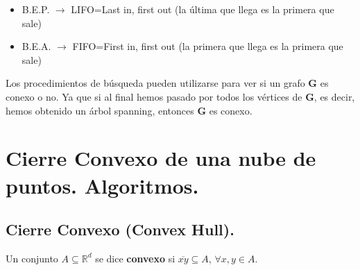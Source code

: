 \documentclass[twoside]{report}
\newcommand{\bs}[1]{\boldsymbol{#1}}
\begin{document}
        \begin{itemize}
            \item B.E.P. $\rightarrow$ LIFO=Last in, first out (la \'{u}ltima que llega es la primera que sale)
            \item B.E.A. $\rightarrow$ FIFO=First in, first out (la primera que llega es la primera que sale)
        \end{itemize}

\vspace{0.2cm}
Los procedimientos de b\'{u}squeda pueden u\-ti\-li\-zar\-se para ver si un grafo $\bs{G}$ es conexo o no. Ya que si al final hemos pasado por todos
los v\'{e}rtices de $\bs{G}$, es decir, hemos obtenido un \'{a}rbol spanning, entonces $\bs{G}$ es conexo.

%
%
%

\newpage

\section{Cierre Convexo de una nube de puntos. Algoritmos.}

\subsection{Cierre Convexo (Convex Hull).}

\begin{defi} Un conjunto $A \subseteq \mathbb{R}^d$ se dice
\textbf{convexo} si $\overline{xy} \subseteq A$, $\forall x,y \in A$.
\end{defi}
\end{document}
